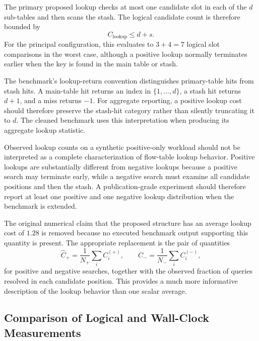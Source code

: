 \documentclass[conference]{IEEEtran}
\begin{document}
The primary proposed lookup checks at most one candidate slot in each of the $d$ sub-tables and then scans the stash. The logical candidate count is therefore bounded by
\begin{equation}
C_{\mathrm{lookup}} \leq d+s.
\label{eq:lookup-cost-results}
\end{equation}
For the principal configuration, this evaluates to $3+4=7$ logical slot comparisons in the worst case, although a positive lookup normally terminates earlier when the key is found in the main table or stash.

The benchmark's lookup-return convention distinguishes primary-table hits from stash hits. A main-table hit returns an index in $\{1,\ldots,d\}$, a stash hit returns $d+1$, and a miss returns $-1$. For aggregate reporting, a positive lookup cost should therefore preserve the stash-hit category rather than silently truncating it to $d$. The cleaned benchmark uses this interpretation when producing its aggregate lookup statistic.

Observed lookup counts on a synthetic positive-only workload should not be interpreted as a complete characterization of flow-table lookup behavior. Positive lookups are substantially different from negative lookups because a positive search may terminate early, while a negative search must examine all candidate positions and then the stash. A publication-grade experiment should therefore report at least one positive and one negative lookup distribution when the benchmark is extended.

The original numerical claim that the proposed structure has an average lookup cost of $1.28$ is removed because no executed benchmark output supporting this quantity is present. The appropriate replacement is the pair of quantities
\begin{equation}
\widehat{C}_{+} = \frac{1}{N_+}\sum_i C_i^{(+)},
\qquad
\widehat{C}_{-} = \frac{1}{N_-}\sum_i C_i^{(-)},
\end{equation}
for positive and negative searches, together with the observed fraction of queries resolved in each candidate position. This provides a much more informative description of the lookup behavior than one scalar average.

\subsection{Comparison of Logical and Wall-Clock Measurements}
\label{subsec:logical_vs_wall}
\end{document}
